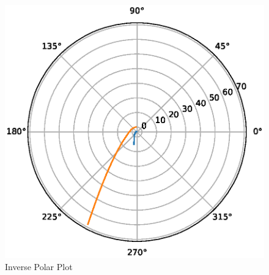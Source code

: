 \begin{enumerate}[label=\thesection.\arabic*.,ref=\thesection.\theenumi]
%
\begin{figure}
\centering
\includegraphics[width=\columnwidth]{./figs/ee18btech11002/ee18btech11002_1.eps}
\caption{Inverse Polar Plot}
\label{fig:ee18btech11002inverse_polar_plot}
\end{figure}


\end{enumerate}
